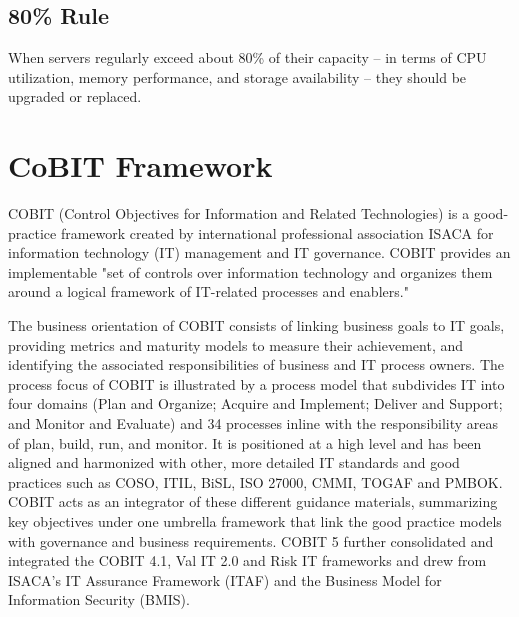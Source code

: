 \documentclass[8pt]{extarticle}
\begin{document}
\begin{multicols}{3}
\subsection{80\% Rule}
When servers regularly exceed about 80\% of their capacity – in terms of CPU utilization, memory performance, 
and storage availability – they should be upgraded or replaced. 

\section{CoBIT Framework}
COBIT (Control Objectives for Information and Related Technologies) is a good-practice framework created by 
international professional association ISACA for information technology (IT) 
management and IT governance. COBIT provides an implementable "set of controls over information technology and organizes
them around a logical framework of IT-related processes and enablers."

The business orientation of COBIT consists of linking business goals to IT goals, providing metrics and maturity models
to measure their achievement, and identifying the associated responsibilities of business and IT process owners.
The process focus of COBIT is illustrated by a process model that subdivides IT into four domains 
(Plan and Organize; Acquire and Implement; Deliver and Support; and Monitor and Evaluate) and 34 processes inline with 
the responsibility areas of plan, build, run, and monitor. It is positioned at a high level and has been aligned and 
harmonized with other, more detailed IT standards and good practices such as COSO, ITIL, BiSL, ISO 27000, CMMI, TOGAF 
and PMBOK. COBIT acts as an integrator of these different guidance materials, summarizing key objectives under one 
umbrella framework that link the good practice models with governance and business requirements.
COBIT 5 further consolidated and integrated the COBIT 4.1, Val IT 2.0 and Risk IT frameworks and drew from ISACA's IT 
Assurance Framework (ITAF) and the Business Model for Information Security (BMIS).


\end{multicols}
\end{document}
